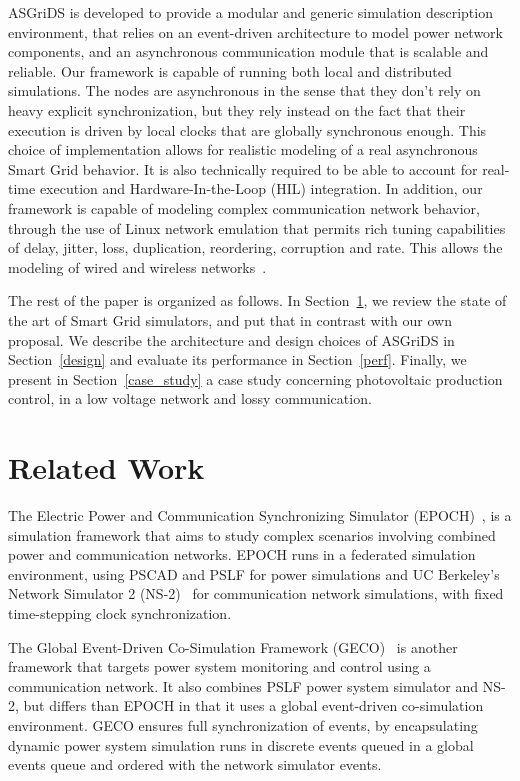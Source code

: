 \documentclass[conference]{IEEEtran}
\begin{document}
ASGriDS is developed to provide a modular and generic simulation description environment, that relies on an event-driven architecture to model power network components, and an asynchronous communication module that is scalable and reliable. Our framework is capable of running both local and distributed simulations. The nodes are asynchronous in the sense that they don't rely on heavy explicit synchronization, but they rely instead on the fact that their execution is driven by local clocks that are globally synchronous enough. This choice of implementation allows for realistic modeling of a real asynchronous Smart Grid behavior. It is also technically required to be able to account for real-time execution and Hardware-In-the-Loop (HIL) integration.
In addition, our framework is capable of modeling complex communication network behavior, through the use of Linux network emulation that permits rich tuning capabilities of delay, jitter, loss, duplication, reordering, corruption and rate. This allows the modeling of wired and wireless networks~\cite{hemminger2005network}.

The rest of the paper is organized as follows. In Section~\ref{related_work}, we review the state of the art of Smart Grid simulators, and put that in contrast with our own proposal. We describe the architecture and design choices of ASGriDS in Section~\ref{design} and evaluate its performance in Section~\ref{perf}. Finally, we present in Section~\ref{case_study} a case study concerning photovoltaic production control, in a low voltage network and lossy communication.

\section{Related Work} \label{related_work}
The Electric Power and Communication Synchronizing Simulator (EPOCH)~\cite{hopkinsonEPOCHSPlatformAgentbased2006}, is a simulation framework that aims to study complex scenarios involving combined power and communication networks. EPOCH runs in a federated simulation environment, using PSCAD and PSLF for power simulations and UC Berkeley’s Network Simulator 2 (NS-2)~\cite{NetworkSimulatorNs2} for communication network simulations, with fixed time-stepping clock synchronization.

The Global Event-Driven Co-Simulation Framework (GECO)~\cite{linGECOGlobalEventDriven} is another framework that targets power system monitoring and control using a communication network. 
It also combines PSLF power system simulator and NS-2, but differs than EPOCH in that it uses a global event-driven co-simulation environment. GECO ensures full synchronization of events, by encapsulating dynamic power system simulation runs in discrete events queued in a global events queue and ordered with the network simulator events.
\end{document}
